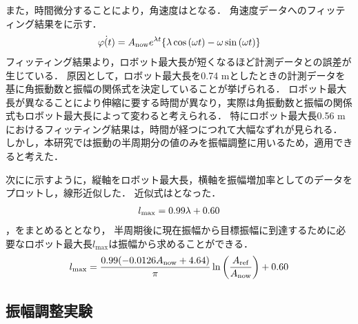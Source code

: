           また，時間微分することにより，角速度はとなる．
          角速度データへのフィッティング結果をに示す．
          \begin{eqnarray}
            \equlabel{Approximation Angular velocity}
            \dot{\varphi(t)}=A_{\mathrm{now}}e^{\lambda t}\{\lambda\cos{(\omega t)}-\omega\sin{(\omega t)}\}
          \end{eqnarray}
          \newpage
          フィッティング結果より，ロボット最大長が短くなるほど計測データとの誤差が生じている．
          原因として，ロボット最大長を0.74 mとしたときの計測データを基に角振動数と振幅の関係式を決定していることが挙げられる．
          ロボット最大長が異なることにより伸縮に要する時間が異なり，実際は角振動数と振幅の関係式もロボット最大長によって変わると考えられる．
          特にロボット最大長0.56 mにおけるフィッティング結果は，時間が経つにつれて大幅なずれが見られる．
          しかし，本研究では振動の半周期分の値のみを振幅調整に用いるため，適用できると考えた．

          次にに示すように，縦軸をロボット最大長，横軸を振幅増加率としてのデータをプロットし，線形近似した．
          近似式はとなった．
          \begin{eqnarray}
            \equlabel{length relation}
            l_{\mathrm{max}}=0.99\lambda+0.60
          \end{eqnarray}
          ，をまとめるととなり，
          半周期後に現在振幅から目標振幅に到達するために必要なロボット最大長$l_{\mathrm{max}}$は振幅から求めることができる．
          \begin{eqnarray}
            \equlabel{l status}
            l_{\mathrm{max}}=\frac{0.99(-0.0126A_{\mathrm{now}}+4.64)}{\pi}\ln{\left(\frac{A_{\mathrm{ref}}}{A_{\mathrm{now}}}\right)}+0.60
          \end{eqnarray}
        \newpage  
        \subsection{振幅調整実験}
        
